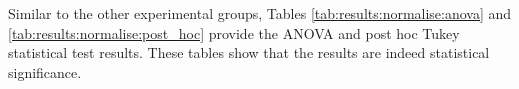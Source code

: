 Similar to the other experimental groups, Tables \ref{tab:results:normalise:anova} and \ref{tab:results:normalise:post_hoc} provide the ANOVA and post hoc Tukey statistical test results. These tables show that the results are indeed statistical significance.


\begin{table}[htbp]
      \centering
      \caption{ANOVA - Rank - BHH Variant: Normalise}
      \label{tab:results:normalise:anova}%
      \par\bigskip

\end{table}


